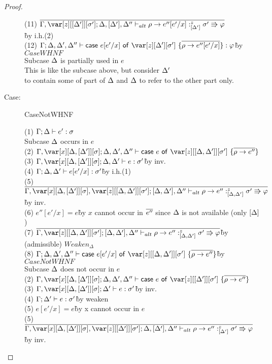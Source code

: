 \begin{proof}
\begin{description}
\begin{tabbing}
    (11) $\ov{\G,\z[\irr{\D'}][\s']; \D,[\D'],\D'' \vdash_{alt} \rho \to e''[e'/x] :^z_{\irr{\D'}} \s'\Rrightarrow\vp}$\\\` by i.h.(2)\\
    (12) $\G;\D,\D',\D'' \vdash \ccase{e[e'/x]}{\z[\D'][\s']~\{\ov{\rho \to e''[e'/x]}\}} : \vp$\` by $CaseWHNF$\\
    Subcase $\Delta$ is partially used in $e$\\
    This is like the subcase above, but consider $\Delta'$\\
    to contain some of part of $\Delta$ and $\Delta$ to refer to the other part only.
\end{tabbing}

\item[Case:] CaseNotWHNF
\begin{tabbing}
    (1) $\Gamma;\Delta\vdash e' :\sigma$\\
    Subcase $\Delta$ occurs in $e$\\
    (2) $\G,\xD; \D, \D', \D'' \vdash \ccase{e}{\z[\irr{\D,\D'}][\s']~\{\ov{\rho\to e''}\}}$\\
    (3) $\G,\xD; \D, \D' \vdash e : \s'$\` by inv.\\
    (4) $\Gamma; \Delta,\Delta' \vdash e[e'/x] : \sigma'$\` by i.h.(1)\\
    (5) $\ov{\G,\xD,\z[\irr{\D,\D'}][\s']; [\D,\D'],\D'' \vdash_{alt} \rho \to e'' :^z_{\irr{\D,\D'}} \s'\Rrightarrow\vp}$\` by inv.\\
    (6) $e''[e'/x] = e$\` by $x$ cannot occur in $\overline{e''}$ since $\Delta$ is not available (only $\left[\Delta\right]$)\\
    (7) $\ov{\G,\z[\irr{\D,\D'}][\s']; [\D,\D'],\D'' \vdash_{alt} \rho \to e'' :^z_{\irr{\D,\D'}} \s'\Rrightarrow\vp}$\` by (admissible) $Weaken_\Delta$\\
    (8) $\G; \D, \D', \D'' \vdash \ccase{e[e'/x]}{\z[\irr{\D,\D'}][\s']~\{\ov{\rho\to e''}\}}$\`by $CaseNotWHNF$\\
    Subcase $\Delta$ does not occur in $e$\\
    (2) $\G,\xD; \D, \D', \D'' \vdash \ccase{e}{\z[\irr{\D'}][\s']~\{\ov{\rho\to e''}\}}$\\
    (3) $\G,\xD; \D' \vdash e : \s'$\` by inv.\\
    (4) $\Gamma; \Delta' \vdash e : \sigma'$\` by weaken\\
    (5) $e[e'/x] = e$\` by x cannot occur in $e$\\
    (5) $\ov{\G,\xD,\z[\irr{\D'}][\s']; \D,[\D'],\D'' \vdash_{alt} \rho \to e'' :^z_{\irr{\D'}} \s'\Rrightarrow\vp}$\` by inv.\\

\end{tabbing}
\end{description}
\end{proof}
